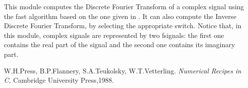 This module computes the Discrete Fourier Transform of a complex signal using the 
fast algorithm based on the one given in \cite{Press}.
It can also compute the Inverse Discrete Fourier Transform, by selecting the appropriate
switch.
Notice that, in this module, complex signals are represented by two fsignals: 
the first one contains the real part of the signal and the second one contains its 
imaginary part. 

\begin{thebibliography}{Dau1}

 W.H.Press, B.P.Flannery, S.A.Teukolsky, W.T.Vetterling.
{\em Numerical Recipes in C,} 
Cambridge University Press,1988. 

\end{thebibliography}